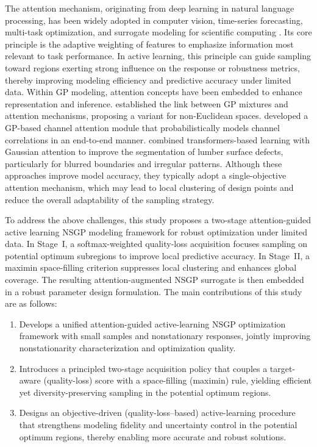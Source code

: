 \documentclass[]{interact}
\theoremstyle{plain}%
\theoremstyle{definition}
\theoremstyle{remark}
\begin{document}
The attention mechanism, originating from deep learning in natural language processing, has been widely adopted in computer vision, time-series forecasting, multi-task optimization, and surrogate modeling for scientific computing \citep{Yu2022}. Its core principle is the adaptive weighting of features to emphasize information most relevant to task performance. In active learning, this principle can guide sampling toward regions exerting strong influence on the response or robustness metrics, thereby improving modeling efficiency and predictive accuracy under limited data. Within GP modeling, attention concepts have been embedded to enhance representation and inference.  \cite{Li2022} established the link between GP mixtures and attention mechanisms, proposing a variant for non-Euclidean spaces. \cite{Xie2022} developed a GP-based channel attention module that probabilistically models channel correlations in an end-to-end manner. \cite{Zhong2024} combined transformers-based learning with Gaussian attention to improve the segmentation of lumber surface defects, particularly for blurred boundaries and irregular patterns. Although these approaches improve model accuracy, they typically adopt a single-objective attention mechanism, which may lead to local clustering of design points and reduce the overall adaptability of the sampling strategy.

To address the above challenges, this study proposes a two-stage attention-guided active learning NSGP modeling framework for robust optimization under limited data. In Stage~I, a softmax-weighted quality-loss acquisition focuses sampling on potential optimum subregions to improve local predictive accuracy. In Stage~II, a maximin space-filling criterion suppresses local clustering and enhances global coverage. The resulting attention-augmented NSGP surrogate is then embedded in a robust parameter design formulation. The main contributions of this study are as follows:
\begin{enumerate}
	\item Develops a unified attention-guided active-learning NSGP optimization framework with small samples and nonstationary responses, jointly improving nonstationarity characterization and optimization quality.
	\item Introduces a principled two-stage acquisition policy that couples a target-aware (quality-loss) score with a space-filling (maximin) rule, yielding efficient yet diversity-preserving sampling in the potential optimum regions.
	\item Designs an objective-driven (quality-loss–based) active-learning procedure that strengthens modeling fidelity and uncertainty control in the potential optimum regions, thereby enabling more accurate and robust solutions.
\end{enumerate}
\end{document}
